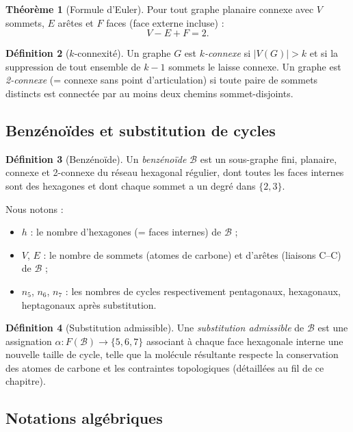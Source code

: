 \documentclass[12pt,a4paper]{article}
\theoremstyle{definition}
\newtheorem{definition}{D\'efinition}[section]
\newtheorem{theoreme}[definition]{Th\'eor\`eme}
\theoremstyle{remark}
\newcommand{\B}{\mathcal{B}}
\newcommand{\ncinq}{n_5}
\newcommand{\nsept}{n_7}
\newcommand{\nhex}{n_6}
\begin{document}
\begin{theoreme}[Formule d'Euler]
Pour tout graphe planaire connexe avec $V$ sommets, $E$ ar\^etes
et $F$ faces (face externe incluse) :
\[
  V - E + F = 2.
\]
\end{theoreme}

\begin{definition}[$k$-connexit\'e]
Un graphe $G$ est \emph{$k$-connexe} si $|V(G)| > k$ et si la suppression
de tout ensemble de $k-1$ sommets le laisse connexe. Un graphe est
\emph{2-connexe} (= connexe sans point d'articulation) si toute paire de
sommets distincts est connect\'ee par au moins deux chemins
sommet-disjoints.
\end{definition}

\subsection{Benz\'eno\"ides et substitution de cycles}

\begin{definition}[Benz\'eno\"ide]
Un \emph{benz\'eno\"ide} $\B$ est un sous-graphe fini, planaire, connexe
et 2-connexe du r\'eseau hexagonal r\'egulier, dont toutes les faces
internes sont des hexagones et dont chaque sommet a un degr\'e dans
$\{2, 3\}$.
\end{definition}

Nous notons :
\begin{itemize}
  \item $h$ : le nombre d'hexagones (= faces internes) de $\B$ ;
  \item $V$, $E$ : le nombre de sommets (atomes de carbone) et
        d'ar\^etes (liaisons C--C) de $\B$ ;
  \item $\ncinq$, $\nhex$, $\nsept$ : les nombres de cycles
        respectivement pentagonaux, hexagonaux, heptagonaux apr\`es
        substitution.
\end{itemize}

\begin{definition}[Substitution admissible]
Une \emph{substitution admissible} de $\B$ est une assignation
$\alpha : F(\B) \to \{5, 6, 7\}$ associant \`a chaque face hexagonale
interne une nouvelle taille de cycle, telle que la mol\'ecule r\'esultante
respecte la conservation des atomes de carbone et les contraintes
topologiques (d\'etaill\'ees au fil de ce chapitre).
\end{definition}

\subsection{Notations alg\'ebriques}
\end{document}
